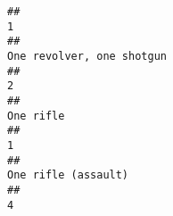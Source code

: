 \documentclass[
]{article}
\begin{document}
\begin{verbatim}
##                                                                                                                                                                                                                                                                                                                                                                                                     1 
##                                                                                                                                                                                                                                                                                                                                                                             One revolver, one shotgun 
##                                                                                                                                                                                                                                                                                                                                                                                                     2 
##                                                                                                                                                                                                                                                                                                                                                                                             One rifle 
##                                                                                                                                                                                                                                                                                                                                                                                                     1 
##                                                                                                                                                                                                                                                                                                                                                                                   One rifle (assault) 
##                                                                                                                                                                                                                                                                                                                                                                                                     4 

\end{verbatim}
\end{document}
